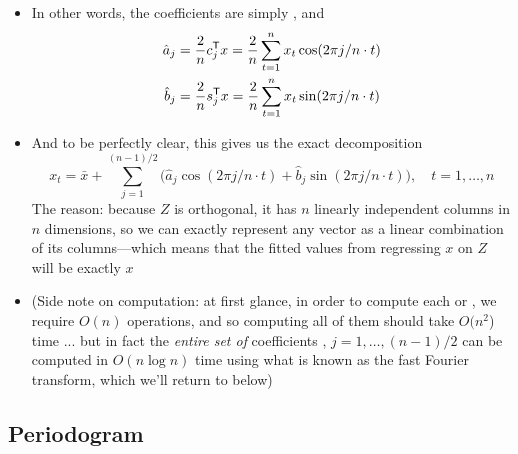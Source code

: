 \documentclass{article}
\begin{document}
\begin{itemize}
\item In other words, the coefficients are simply , and 
  \begin{equation}
  \label{eq:fourier_coef}
  \begin{aligned}
  \hat{a}_j &= \frac{2}{n} c_j^{\mathsf{T}} x = \frac{2}{n} \sum_{t=1}^n x_t \cos(2\pi j/n
  \cdot t) \\
  \hat{b}_j &= \frac{2}{n} s_j^{\mathsf{T}} x = \frac{2}{n} \sum_{t=1}^n x_t \sin(2\pi j/n
  \cdot t) 
  \end{aligned}
  \end{equation}

\item And to be perfectly clear, this gives us the exact decomposition 
  \begin{equation}
  \label{eq:fourier_decomp}
  x_t = \bar{x} + \sum_{j=1}^{(n-1)/2} \Big( \hat{a}_j \cos(2\pi j/n \cdot t) + 
  \hat{b}_j \sin(2\pi j/n \cdot t) \Big), \quad t = 1,\dots,n 
  \end{equation}
  The reason: because $Z$ is orthogonal, it has $n$ linearly independent
  columns in $n$ dimensions, so we can exactly represent any vector as a linear
  combination of its columns---which means that the fitted values from
  regressing $x$ on $Z$ will be exactly $x$  

\item (Side note on computation: at first glance, in order to compute each
   or , we require $O(n)$ operations, and 
  so computing all of them should take $O(n^2$) time ... but in fact the
  \emph{entire set of} coefficients , $j =
  1,\dots,(n-1)/2$ can be computed in $O(n \log{n})$ time using what is known as
  the fast Fourier transform, which we'll return to below)
\end{itemize}

\subsection{Periodogram}
\end{document}
